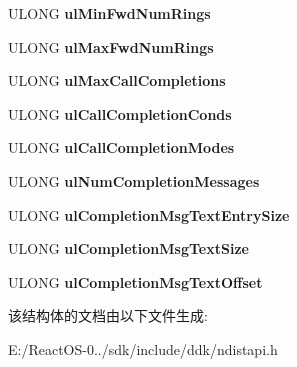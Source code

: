 \begin{DoxyCompactItemize}
U\+L\+O\+NG {\bfseries ul\+Min\+Fwd\+Num\+Rings}
\item 
\mbox{\label{struct___l_i_n_e___a_d_d_r_e_s_s___c_a_p_s_ad79c4a4ef64026662e180bf6de9e33d5}} 
U\+L\+O\+NG {\bfseries ul\+Max\+Fwd\+Num\+Rings}
\item 
\mbox{\label{struct___l_i_n_e___a_d_d_r_e_s_s___c_a_p_s_ad58a952a461775a4bfacd969037953db}} 
U\+L\+O\+NG {\bfseries ul\+Max\+Call\+Completions}
\item 
\mbox{\label{struct___l_i_n_e___a_d_d_r_e_s_s___c_a_p_s_abb354d816a31ad4ddf5fa20df6e3655a}} 
U\+L\+O\+NG {\bfseries ul\+Call\+Completion\+Conds}
\item 
\mbox{\label{struct___l_i_n_e___a_d_d_r_e_s_s___c_a_p_s_ae85858b30bbacebdf89cd30bc7db8abb}} 
U\+L\+O\+NG {\bfseries ul\+Call\+Completion\+Modes}
\item 
\mbox{\label{struct___l_i_n_e___a_d_d_r_e_s_s___c_a_p_s_a7a800d6a7e352b57bb87fc9a6422de74}} 
U\+L\+O\+NG {\bfseries ul\+Num\+Completion\+Messages}
\item 
\mbox{\label{struct___l_i_n_e___a_d_d_r_e_s_s___c_a_p_s_a459c7c98bb6241c9897ace8b7310e99d}} 
U\+L\+O\+NG {\bfseries ul\+Completion\+Msg\+Text\+Entry\+Size}
\item 
\mbox{\label{struct___l_i_n_e___a_d_d_r_e_s_s___c_a_p_s_a6aef0400d62bbf0cbb8a82b9d2caee38}} 
U\+L\+O\+NG {\bfseries ul\+Completion\+Msg\+Text\+Size}
\item 
\mbox{\label{struct___l_i_n_e___a_d_d_r_e_s_s___c_a_p_s_a70d5937323ea2371269c9207fb933140}} 
U\+L\+O\+NG {\bfseries ul\+Completion\+Msg\+Text\+Offset}
\end{DoxyCompactItemize}


该结构体的文档由以下文件生成\+:\begin{DoxyCompactItemize}
\item 
E\+:/\+React\+O\+S-\/0../sdk/include/ddk/ndistapi.\+h\end{DoxyCompactItemize}
